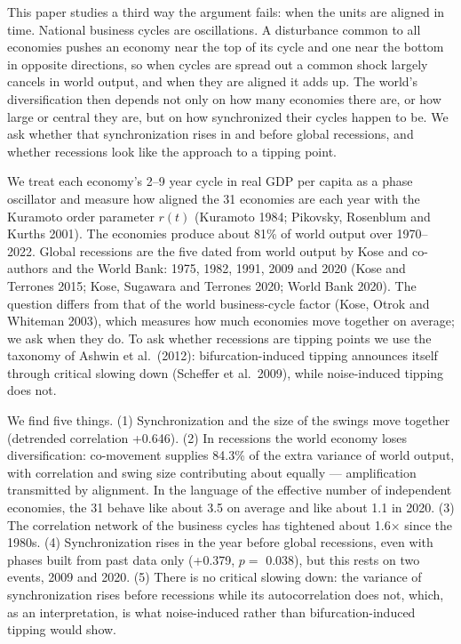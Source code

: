 \documentclass[11pt,a4paper]{article}
\begin{document}
This paper studies a third way the argument fails: when the units are aligned in time. National business cycles are oscillations. A disturbance common to all economies pushes an economy near the top of its cycle and one near the bottom in opposite directions, so when cycles are spread out a common shock largely cancels in world output, and when they are aligned it adds up. The world's diversification then depends not only on how many economies there are, or how large or central they are, but on how synchronized their cycles happen to be. We ask whether that synchronization rises in and before global recessions, and whether recessions look like the approach to a tipping point.

We treat each economy's 2–9 year cycle in real GDP per capita as a phase oscillator and measure how aligned the 31 economies are each year with the Kuramoto order parameter \(r(t)\) (Kuramoto 1984; Pikovsky, Rosenblum and Kurths 2001). The economies produce about 81\% of world output over 1970–2022. Global recessions are the five dated from world output by Kose and co-authors and the World Bank: 1975, 1982, 1991, 2009 and 2020 (Kose and Terrones 2015; Kose, Sugawara and Terrones 2020; World Bank 2020). The question differs from that of the world business-cycle factor (Kose, Otrok and Whiteman 2003), which measures how much economies move together on average; we ask when they do. To ask whether recessions are tipping points we use the taxonomy of Ashwin et al.~(2012): bifurcation-induced tipping announces itself through critical slowing down (Scheffer et al.~2009), while noise-induced tipping does not.

We find five things. (1) Synchronization and the size of the swings move together (detrended correlation +0.646). (2) In recessions the world economy loses diversification: co-movement supplies 84.3\% of the extra variance of world output, with correlation and swing size contributing about equally — amplification transmitted by alignment. In the language of the effective number of independent economies, the 31 behave like about 3.5 on average and like about 1.1 in 2020. (3) The correlation network of the business cycles has tightened about 1.6× since the 1980s. (4) Synchronization rises in the year before global recessions, even with phases built from past data only (+0.379, \(p =\) 0.038), but this rests on two events, 2009 and 2020. (5) There is no critical slowing down: the variance of synchronization rises before recessions while its autocorrelation does not, which, as an interpretation, is what noise-induced rather than bifurcation-induced tipping would show.
\end{document}
